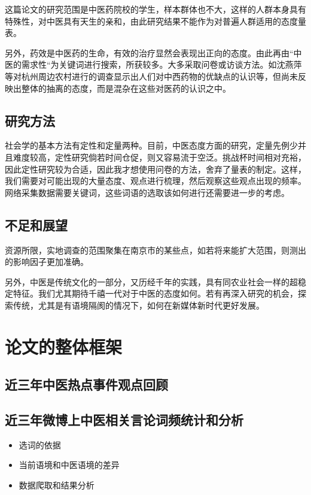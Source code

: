 \documentclass{ctexart}
\begin{document}
这篇论文的研究范围是中医药院校的学生，样本群体也不大，这样的人群本身具有特殊性，对中医具有天生的亲和，由此研究结果不能作为对普遍人群适用的态度量表。

另外，药效是中医药的生命，有效的治疗显然会表现出正向的态度。由此再由“中医的需求性“为关键词进行搜索，所获较多。大多采取问卷或访谈方法。如沈燕萍\cite{syp2006}等对杭州周边农村进行的调查显示出人们对中西药物的优缺点的认识等，但尚未反映出整体的抽离的态度，而是混杂在这些对医药的认识之中。

\subsection{研究方法}
社会学的基本方法有定性和定量两种。目前，中医态度方面的研究，定量先例少并且难度较高，定性研究倘若时间仓促，则又容易流于空泛。挑战杯时间相对充裕，因此定性研究较为合适，因此我才想使用问卷的方法，舍弃了量表的制定。这样，我们需要对可能出现的大量态度、观点进行梳理，然后观察这些观点出现的频率。网络采集数据需要关键词，这些词语的选取该如何进行还需要进一步的考虑。

\subsection{不足和展望}
资源所限，实地调查的范围聚集在南京市的某些点，如若将来能扩大范围，则测出的影响因子更加准确。

另外，中医是传统文化的一部分，又历经千年的实践，具有同农业社会一样的超稳定特征。我们尤其期待千禧一代对于中医的态度如何。若有再深入研究的机会，探索传统，尤其是有语境隔阂的情况下，如何在新媒体新时代更好发展。

\section{论文的整体框架}
    \subsection{近三年中医热点事件观点回顾}
    \subsection{近三年微博上中医相关言论词频统计和分析}
\begin{itemize}
	\item 选词的依据
	\item 当前语境和中医语境的差异
	\item 数据爬取和结果分析 
\end{itemize}
\end{document}
